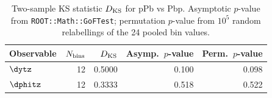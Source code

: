 \begin{table}[hbtp]
\centering
\begin{tabular}{|l|r|r|r|r|}
\hline
Observable & $N_{\rm bins}$ & $D_{\rm KS}$ & Asymp.\ $p$-value & Perm.\ $p$-value \\
\hline
$\dytz$ & 12 & 0.5000 & 0.100 & 0.098 \\
$\dphitz$ & 12 & 0.3333 & 0.518 & 0.522 \\
\hline
\end{tabular}
\caption{Two-sample KS statistic $D_{\rm KS}$ for pPb vs Pbp. Asymptotic $p$-value from \texttt{ROOT::Math::GoFTest}; permutation $p$-value from $10^5$ random relabellings of the 24 pooled bin values.}
\label{table:combining_ks}
\end{table}
